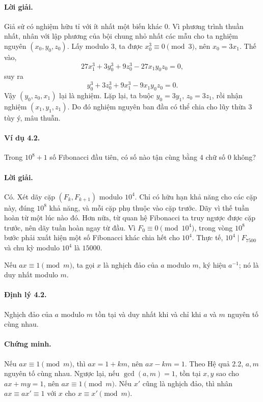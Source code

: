 \documentclass[11pt]{article}
\begin{document}
\paragraph{Lời giải.}
Giả sử có nghiệm hữu tỉ với ít nhất một biến khác \(0\). Vì phương trình thuần
nhất, nhân với lập phương của bội chung nhỏ nhất các mẫu cho ta nghiệm nguyên
\((x_0,y_0,z_0)\). Lấy modulo \(3\), ta được \(x_0^3\equiv0\pmod3\), nên
\(x_0=3x_1\). Thế vào,
\[
 27x_1^3+3y_0^3+9z_0^3-27x_1y_0z_0=0,
\]
suy ra
\[
 y_0^3+3z_0^3+9x_1^3-9x_1y_0z_0=0.
\]
Vậy \((y_0,z_0,x_1)\) lại là nghiệm. Lặp lại, ta buộc \(y_0=3y_1\),
\(z_0=3z_1\), rồi nhận nghiệm \((x_1,y_1,z_1)\). Do đó nghiệm nguyên ban đầu
có thể chia cho lũy thừa \(3\) tùy ý, mâu thuẫn.

\paragraph{Ví dụ 4.2.}
Trong \(10^8+1\) số Fibonacci đầu tiên, có số nào tận cùng bằng \(4\) chữ số
\(0\) không?

\paragraph{Lời giải.}
Có. Xét dãy cặp \((F_k,F_{k+1})\) modulo \(10^4\). Chỉ có hữu hạn khả năng
cho các cặp này, đúng \(10^8\) khả năng, và mỗi cặp phụ thuộc vào cặp trước.
Dãy vì thế tuần hoàn từ một lúc nào đó. Hơn nữa, từ quan hệ Fibonacci ta truy
ngược được cặp trước, nên dãy tuần hoàn ngay từ đầu. Vì \(F_0\equiv0\pmod{10^4}\),
trong vòng \(10^8\) bước phải xuất hiện một số Fibonacci khác chia hết cho
\(10^4\). Thực tế, \(10^4\mid F_{7500}\) và chu kỳ modulo \(10^4\) là \(15000\).

Nếu \(ax\equiv1\pmod m\), ta gọi \(x\) là nghịch đảo của \(a\) modulo \(m\),
ký hiệu \(a^{-1}\); nó là duy nhất modulo \(m\).

\paragraph{Định lý 4.2.}
Nghịch đảo của \(a\) modulo \(m\) tồn tại và duy nhất khi và chỉ khi \(a\) và
\(m\) nguyên tố cùng nhau.

\paragraph{Chứng minh.}
Nếu \(ax\equiv1\pmod m\), thì \(ax=1+km\), nên \(ax-km=1\). Theo Hệ quả 2.2,
\(a,m\) nguyên tố cùng nhau. Ngược lại, nếu \(\gcd(a,m)=1\), tồn tại \(x,y\)
sao cho \(ax+my=1\), nên \(ax\equiv1\pmod m\). Nếu \(x'\) cũng là nghịch đảo,
thì nhân \(ax\equiv ax'\equiv1\) với \(x\) cho \(x\equiv x'\pmod m\).
\end{document}
